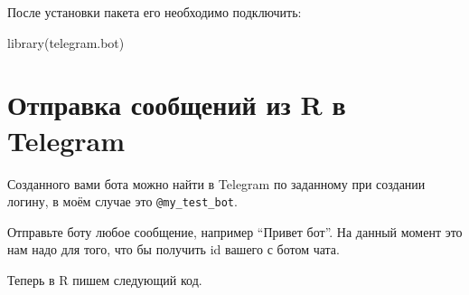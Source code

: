 \documentclass[
]{book}
\newenvironment{Shaded}{\begin{snugshade}}{\end{snugshade}}
\newcommand{\AttributeTok}[1]{\textcolor[rgb]{0.77,0.63,0.00}{#1}}
\newcommand{\CommentTok}[1]{\textcolor[rgb]{0.56,0.35,0.01}{\textit{#1}}}
\newcommand{\FunctionTok}[1]{\textcolor[rgb]{0.00,0.00,0.00}{#1}}
\newcommand{\NormalTok}[1]{#1}
\newcommand{\OtherTok}[1]{\textcolor[rgb]{0.56,0.35,0.01}{#1}}
\newcommand{\SpecialCharTok}[1]{\textcolor[rgb]{0.00,0.00,0.00}{#1}}
\newcommand{\StringTok}[1]{\textcolor[rgb]{0.31,0.60,0.02}{#1}}
\begin{document}
После установки пакета его необходимо подключить:

\begin{Shaded}
\begin{Highlighting}[]
\FunctionTok{library}\NormalTok{(telegram.bot)}
\end{Highlighting}
\end{Shaded}

\hypertarget{ux43eux442ux43fux440ux430ux432ux43aux430-ux441ux43eux43eux431ux449ux435ux43dux438ux439-ux438ux437-r-ux432-telegram}{%
\section{Отправка сообщений из R в Telegram}\label{ux43eux442ux43fux440ux430ux432ux43aux430-ux441ux43eux43eux431ux449ux435ux43dux438ux439-ux438ux437-r-ux432-telegram}}

Созданного вами бота можно найти в Telegram по заданному при создании логину, в моём случае это \texttt{@my\_test\_bot}.

Отправьте боту любое сообщение, например ``Привет бот''. На данный момент это нам надо для того, что бы получить id вашего с ботом чата.

Теперь в R пишем следующий код.

\begin{Shaded}
\end{Shaded}
\end{document}
